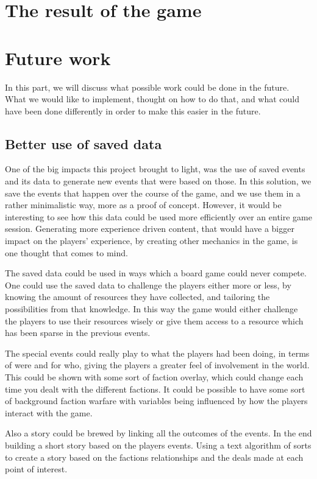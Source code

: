 \section{The result of the game}
\section{Future work}
In this part, we will discuss what possible work could be done in the future. What we would like to implement, thought on how to do that, and what could have been done differently in order to make this easier in the future.
\subsection{Better use of saved data}
\label{sec:savdat}
One of the big impacts this project brought to light, was the use of saved events and its data to generate new events that were based on those. In this solution, we save the events that happen over the course of the game, and we use them in a rather minimalistic way, more as a proof of concept. However, it would be interesting to see how this data could be used more efficiently over an entire game session. Generating more experience driven content, that would have a bigger impact on the players' experience, by creating other mechanics in the game, is one thought that comes to mind. 

The saved data could be used in ways which a board game could never compete. One could use the saved data to challenge the players either more or less, by knowing the amount of resources they have collected, and tailoring the possibilities from that knowledge. In this way the game would either challenge the players to use their resources wisely or give them access to a resource which has been sparse in the previous events. 

The special events could really play to what the players had been doing, in terms of were and for who, giving the players a greater feel of involvement in the world. This could be shown with some sort of faction overlay, which could change each time you dealt with the different factions. It could be possible to have some sort of background faction warfare with variables being influenced by how the players interact with the game.

Also a story could be brewed by linking all the outcomes of the events. In the end building a short story based on the players events. Using a text algorithm of sorts to create a story based on the factions relationships and the deals made at each point of interest. 

